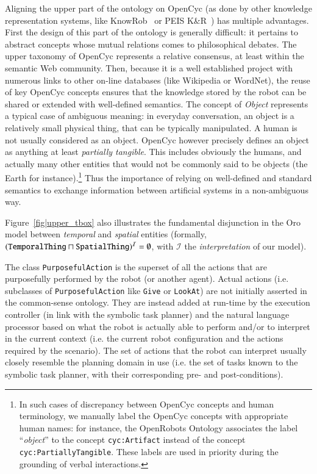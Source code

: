 \documentclass[preprint,3p,times]{elsarticle}
\newcommand{\concept}[1]{{\small \texttt{#1}}}
\newcommand{\ie}{i.e.\xspace}
\begin{document}
Aligning the upper part of the ontology on {\sc OpenCyc} (as done by other
knowledge representation systems, like {\sc KnowRob}~\cite{Tenorth2009a} or PEIS
K\&R~\cite{Daoutis2009}) has multiple advantages. First the design of this part
of the ontology is generally difficult: it pertains to abstract concepts whose
mutual relations comes to philosophical debates. The upper taxonomy of {\sc
OpenCyc} represents a relative consensus, at least within the semantic Web
community. Then, because it is a well established project with numerous links to
other on-line databases (like Wikipedia or WordNet), the reuse of key {\sc
OpenCyc} concepts ensures that the knowledge stored by the robot can be shared
or extended with well-defined semantics. The concept of \emph{Object} represents
a typical case of ambiguous meaning: in everyday conversation, an object is a
relatively small physical thing, that can be typically manipulated. A human is
not usually considered as an object. {\sc OpenCyc} however precisely defines an
object as anything at least \emph{partially tangible}. This includes obviously
the humans, and actually many other entities that would not be commonly said to
be objects (the Earth for instance).\footnote{In such cases of discrepancy
between {\sc OpenCyc} concepts and human terminology, we manually label the {\sc
OpenCyc} concepts with appropriate human names: for instance, the OpenRobots
Ontology associates the label ``\emph{object}'' to the concept
\concept{cyc:Artifact} instead of the concept \concept{cyc:PartiallyTangible}.
These labels are used in priority during the grounding of verbal interactions.}
Thus the importance of relying on well-defined and standard semantics to
exchange information between artificial systems in a non-ambiguous way.

Figure~\ref{fig|upper_tbox} also illustrates the fundamental disjunction
in the {\sc Oro} model between \emph{temporal} and \emph{spatial} entities (formally,
$(\text{\tt TemporalThing} \sqcap \text{\tt SpatialThing})^{\mathcal{I}} = \emptyset$, with
$\mathcal{I}$ the \emph{interpretation} of our model).

The class \concept{PurposefulAction} is the superset of all the actions that are
purposefully performed by the robot (or another agent). Actual actions (\ie
subclasses of \concept{PurposefulAction} like \concept{Give} or
\concept{LookAt}) are not initially asserted in the common-sense ontology. They
are instead added at run-time by the execution controller (in link with the
symbolic task planner) and the natural language processor based on what the
robot is actually able to perform and/or to interpret in the current context
(\ie the current robot configuration and the actions required by the scenario).
The set of actions that the robot can interpret usually closely resemble the
planning domain in use (\ie the set of tasks known to the symbolic task planner,
with their corresponding pre- and post-conditions).
\end{document}
